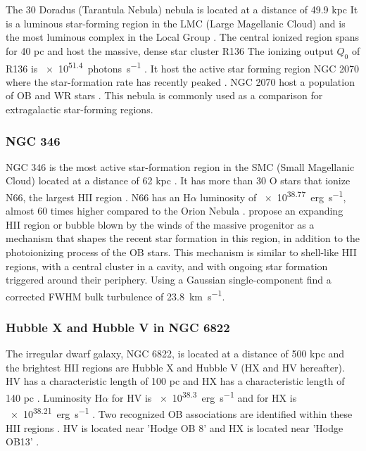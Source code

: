 \documentclass[fleqn,usenatbib, useAMS, a4paper]{mnras}
\newcommand\ha{\ensuremath{\text{H}\alpha}}
\begin{document}
The 30 Doradus (Tarantula Nebula) nebula is located at a distance of 49.9 kpc \citep{2013Natur.495...76P}
It is a luminous star-forming region in the LMC (Large Magellanic Cloud) and is the most luminous complex in the Local Group \citep{1984ApJ...287..116K}.
The central ionized region spans for 40 pc and host the massive, dense star cluster R136 %
The ionizing output \(Q_0\) of R136 is \SI{e51.4}{photons.s^{-1}} \citep{2020MNRAS.499.1918B}.
It host the active star forming region NGC 2070 \citep{2013AJ....145...98W} where the star-formation rate has recently peaked \citep{2015ApJ...811...76C}. 
NGC 2070 host a population of OB and WR stars \citep{2011A&A...530A.108E}.
This nebula is commonly used as a comparison for extragalactic star-forming regions.

\subsubsection{NGC 346}
\label{sec:ngc-346}

NGC 346 is the most active star-formation region in the SMC (Small Magellanic Cloud) located at a distance of 62 kpc \citep{2001ApJ...562..303D}. 
It has more than 30 O stars that ionize N66, the largest HII region \citep{2011ApJ...740...10D}.
N66 has an \ha{} luminosity of \SI{e38.77}{erg.s^{-1}}, almost 60 times higher compared to the Orion Nebula \citep{2010A&A...517A..39H,1984ApJ...287..116K}.
\citet{2008ApJ...688.1050G} propose an expanding HII region or bubble blown by the winds of the massive progenitor as a mechanism that shapes the recent star formation in this region, in addition to the photoionizing process of the OB stars. 
This mechanism is similar to shell-like HII regions, with a central cluster in a cavity, and with ongoing star formation triggered around their periphery.
Using a Gaussian single-component \citet{2003ApJ...586.1179D} find a corrected FWHM bulk turbulence of \SI{23.8}{km.s^{-1}}. 

\subsubsection{Hubble X and Hubble V in NGC 6822}
\label{sec:6822-hubble}
The irregular dwarf galaxy, NGC 6822, is located at a distance of 500 kpc \citep{2012A&A...540A.135S} and the brightest HII regions are Hubble X and Hubble V (HX and HV hereafter). %
HV has a characteristic length of 100 pc and HX has a characteristic length of 140 pc \citep{1999PASP..111.1382O}.
Luminosity \ha{} for HV is \SI{e38.3}{erg.s^{-1}} and for HX is \SI{e38.21}{erg.s^{-1}} \citep{2002MNRAS.329..481B}.
Two recognized OB associations are identified within these HII regions \citep{1991ApJ...379..621H,1992AJ....104.1374W}.
HV is located near 'Hodge OB 8' and HX is located near 'Hodge OB13'  \citep{1999PASP..111.1382O}.
\end{document}

